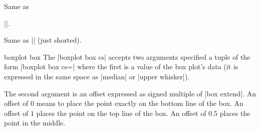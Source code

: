 \begin{command}{\pgfplotsboxplotvalue{}}
	Same as 

	||.

\end{command}

\begin{command}{\boxplotvalue{}}
	Same as |\pgfplotsboxplotvalue| (just shorted).
\end{command}

\begin{coordinatesystem}{boxplot box}%
	The |boxplot box cs| accepts two arguments specified a tuple of the form
 |boxplot box cs=|
	where the first is a value of the box plot's data (it is expressed in the same space as |median| or |upper whisker|). 

	The second argument is an offset expressed as signed multiple of |box extend|. An offset of $0$ means to place the point exactly on the bottom line of the box. An offset of $1$ places the point on the top line of the box. An offset of $0.5$ places the point in the middle.

\begin{codeexample}[]
\end{codeexample}
\end{coordinatesystem}

